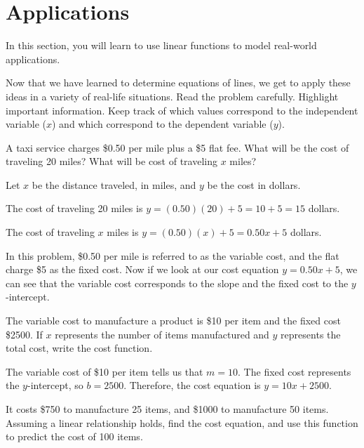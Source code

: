 \section{Applications}
In this section, you will learn to use linear functions to model real-world applications.

Now that we have learned to determine equations of lines, we get to apply these ideas in a variety of real-life situations.  
Read the problem carefully. Highlight important information.  Keep track of which values correspond to the independent variable ($x$) and which correspond to the dependent variable ($y$).

\begin{example}
A taxi service charges \$0.50 per mile plus a \$5 flat fee.  What will be the cost of traveling 20 miles?  What will be cost of traveling $x$ miles?
\end{example}

\begin{solution}
Let $x$ be the distance traveled, in miles, and $y$ be the cost in dollars.

The cost of traveling 20 miles is $y = (0.50)(20) + 5 = 10 + 5 = 15$ dollars.

The cost of traveling $x$ miles is $y = (0.50)(x) + 5 = 0.50x + 5$ dollars.

In this problem, \$0.50 per mile is referred to as the variable cost, and the flat charge \$5 as the fixed cost.  Now if we look at our cost equation $y = 0.50x + 5$, we can see that the variable cost corresponds to the slope and the fixed cost to the $y$-intercept.
\end{solution}

\begin{example}
The variable cost to manufacture a product is \$10 per item and the fixed cost \$2500.  
If $x$ represents the number of items manufactured and $y$ represents the total cost, write the cost function.
\end{example}

\begin{solution}
The variable cost of \$10 per item tells us that $m = 10$.
The fixed cost represents the $y$-intercept, so $b = 2500$.
Therefore, the cost equation is $y = 10x + 2500$.
\end{solution}

\begin{example}
It costs \$750 to manufacture 25 items, and \$1000 to manufacture 50 items.  Assuming a linear relationship holds, find the cost equation, and use this function to predict the cost of 100 items.
\end{example}

